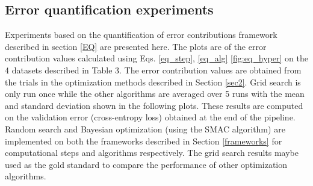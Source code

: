 \subsection{Error quantification experiments}
\label{eq_expts}
Experiments based on the quantification of error contributions framework described in section \ref{EQ} are presented here. The plots are of the error contribution values calculated using Eqs. \ref{eq_step}, \ref{eq_alg} \ref{fig:eq_hyper} on the 4 datasets described in Table 3. The error contribution values are obtained from the trials in the optimization methods described in Section \ref{sec2}. Grid search is only run once while the other algorithms are averaged over 5 runs with the mean and standard deviation shown in the following plots. These results are computed on the validation error (cross-entropy loss) obtained at the end of the pipeline. Random search and Bayesian optimization (using the SMAC algorithm) are implemented on both the frameworks described in Section \ref{frameworks} for computational steps and algorithms respectively. The grid search results maybe used as the gold standard to compare the performance of other optimization algorithms. 

